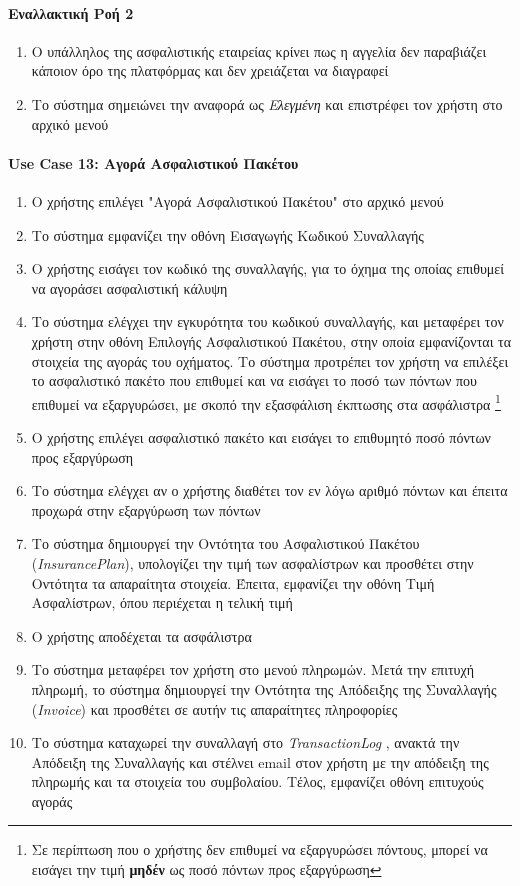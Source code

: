 \documentclass{../ol-softwaremanual}
\begin{document}
	\paragraph{Εναλλακτική Ροή 2}
	\begin{enumerate}
		\item Ο υπάλληλος της ασφαλιστικής εταιρείας κρίνει πως η αγγελία δεν παραβιάζει κάποιον όρο της πλατφόρμας και δεν χρειάζεται να διαγραφεί
		\item Το σύστημα σημειώνει την αναφορά ως \textit{Ελεγμένη}	και επιστρέφει τον χρήστη στο αρχικό μενού
	\end{enumerate}
	
	\paragraph{\en Use Case 13: \gr Αγορά Ασφαλιστικού Πακέτου}
	\begin{enumerate}
		\item Ο χρήστης επιλέγει \en"\gr Αγορά Ασφαλιστικού Πακέτου\en" \gr στο αρχικό μενού
		\item Το σύστημα εμφανίζει την οθόνη Εισαγωγής Κωδικού Συναλλαγής
		\item Ο χρήστης εισάγει τον κωδικό της συναλλαγής, για το όχημα της οποίας επιθυμεί να αγοράσει ασφαλιστική κάλυψη
		\item Το σύστημα ελέγχει την εγκυρότητα του κωδικού συναλλαγής, και μεταφέρει τον χρήστη στην οθόνη Επιλογής Ασφαλιστικού Πακέτου, στην οποία εμφανίζονται τα στοιχεία της αγοράς του οχήματος. Το σύστημα προτρέπει τον χρήστη να επιλέξει το ασφαλιστικό πακέτο που επιθυμεί και να εισάγει το ποσό των πόντων που επιθυμεί να εξαργυρώσει, με σκοπό την εξασφάλιση έκπτωσης στα ασφάλιστρα \footnote[3]{Σε περίπτωση που ο χρήστης δεν επιθυμεί να εξαργυρώσει πόντους, μπορεί να εισάγει την τιμή \textbf{μηδέν} ως ποσό πόντων προς εξαργύρωση}
		\item Ο χρήστης επιλέγει ασφαλιστικό πακέτο και εισάγει το επιθυμητό ποσό πόντων προς εξαργύρωση
		\item Το σύστημα ελέγχει αν ο χρήστης διαθέτει τον εν λόγω αριθμό πόντων και έπειτα			προχωρά στην εξαργύρωση των πόντων 	
		\item Το σύστημα δημιουργεί την Οντότητα του Ασφαλιστικού Πακέτου (\en \textit{InsurancePlan}\gr), υπολογίζει την τιμή των ασφαλίστρων και προσθέτει στην Οντότητα τα απαραίτητα στοιχεία. Έπειτα, εμφανίζει την οθόνη Τιμή Ασφαλίστρων, όπου περιέχεται η τελική τιμή 
		\item Ο χρήστης αποδέχεται τα ασφάλιστρα
		\item Το σύστημα μεταφέρει τον χρήστη στο μενού πληρωμών. Μετά την επιτυχή πληρωμή, το σύστημα δημιουργεί την Οντότητα της Απόδειξης της Συναλλαγής (\en \textit{Invoice}\gr) και προσθέτει σε αυτήν τις απαραίτητες πληροφορίες
		\item Το σύστημα καταχωρεί την συναλλαγή στο \en \textit{TransactionLog} \gr, ανακτά την Απόδειξη της Συναλλαγής και στέλνει \en email \gr στον χρήστη με την απόδειξη της πληρωμής και τα στοιχεία του συμβολαίου. Τέλος, εμφανίζει οθόνη επιτυχούς αγοράς
	\end{enumerate}
	
\end{document}
